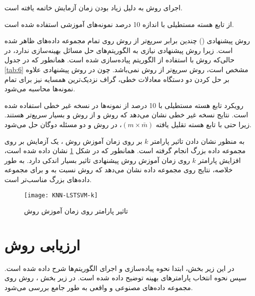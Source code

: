 \begin{sidewaystable*}
\begin{threeparttable}
\begin{tabular}{c c c c c c c c c c c c c}
			\bottomrule
		\end{tabular}
		\begin{tablenotes}
			\item[\lr{a}] اجرای روش به دلیل زیاد بودن زمان آزمایش خاتمه یافته است.
			\item[\lr{b}] از تابع هسته مستطیلی با اندازه 10 درصد نمونه‌های آموزشی استفاده شده است.
		\end{tablenotes}
	\end{threeparttable}
	\label{tab:6}
\end{sidewaystable*}

روش پیشنهادی () چندین برابر سریع‌تر از روش  روی تمام مجموعه داده‌های  ظاهر شده است. زیرا روش پیشنهادی نیازی به الگوریتم‌های حل مسائل بهینه‌سازی ندارد، در حالی‌که روش  با استفاده از الگوریتم  پیاده‌سازی شده است. همانطور که در جدول \ref{tab:6} مشخص است، روش  سریع‌تر از روش  نمی‌باشد. چون در روش پیشنهادی علاوه بر حل کردن دو دستگاه معادلات خطی، گراف نزدیک‌ترین همسایه نیز برای تمام نمونه‌ها محاسبه می‌شود. 

رویکرد تابع هسته مستطیلی با 10 درصد از نمونه‌ها در نسخه غیر خطی استفاده شده است. نتایج نسخه غیر خطی نشان می‌دهد که روش  و  از روش  و  بسیار سریع‌تر هستند. زیرا حتی با تابع هسته تقلیل یافته  $(m \times \bar{m})$، در روش  و  دو مسئله دوگان حل می‌شود.

به منظور نشان دادن تاثیر پارامتر $k$  بر روی زمان آموزش روش ، یک آزمایش بر روی مجموعه داده بزرگ  انجام گرفته است. همانطور که در شکل \ref{fig:KNN-LSTSVM-k} نشان داده شده است، افزایش پارامتر  $k$ روی زمان آموزش روش پیشنهادی تاثیر بسیار اندکی دارد. به طور خلاصه، نتایج روی مجموعه داده  نشان می‌دهد که روش  نسبت به  و  برای مجموعه داده‌های بزرگ مناسب‌تر است. 

\begin{figure}[!t]
	\centering
	\texttt{[image: KNN-LSTSVM-k]}
	\caption{تاثیر پارامتر  روی زمان آموزش روش }
	\label{fig:KNN-LSTSVM-k}
\end{figure}

\newpage

\section{ارزیابی روش }\label{sec:5:3}
در این زیر بخش، ابتدا نحوه پیاده‌سازی و اجرای الگوریتم‌ها شرح داده شده است. سپس نحوه انتخاب پارامترهای بهینه توضیح داده شده است. در زیر بخش ، روش  روی مجموعه داده‌های مصنوعی و واقعی به طور جامع بررسی می‌شود.


